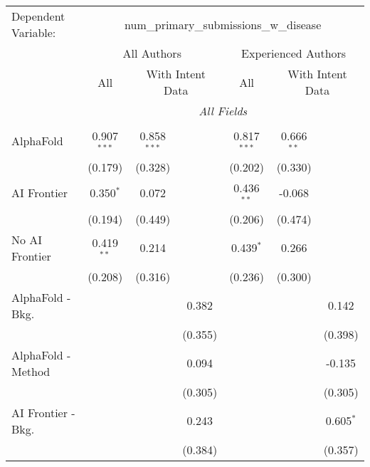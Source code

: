 \begingroup
\centering
\begin{tabular}{lcccccc}
   \tabularnewline \midrule \midrule
   Dependent Variable: & \multicolumn{6}{c}{num\_primary\_submissions\_w\_disease}\\
 & \multicolumn{3}{c}{All Authors} & \multicolumn{3}{c}{Experienced Authors} \\
\cmidrule(lr){2-4} \cmidrule(lr){5-7}
 & \multicolumn{1}{c}{All} & \multicolumn{2}{c}{With Intent Data} & \multicolumn{1}{c}{All} & \multicolumn{2}{c}{With Intent Data} \\
\cmidrule(lr){2-2} \cmidrule(lr){3-4} \cmidrule(lr){5-5} \cmidrule(lr){6-7}
 & \multicolumn{6}{c}{\textit{All Fields}} \\ \\
   AlphaFold               & 0.907$^{***}$ & 0.858$^{***}$ &              & 0.817$^{***}$ & 0.666$^{**}$ &   \\   
                           & (0.179)       & (0.328)       &              & (0.202)       & (0.330)      &   \\   
   AI Frontier             & 0.350$^{*}$   & 0.072         &              & 0.436$^{**}$  & -0.068       &   \\   
                           & (0.194)       & (0.449)       &              & (0.206)       & (0.474)      &   \\   
   No AI Frontier          & 0.419$^{**}$  & 0.214         &              & 0.439$^{*}$   & 0.266        &   \\   
                           & (0.208)       & (0.316)       &              & (0.236)       & (0.300)      &   \\   
   AlphaFold - Bkg.        &               &               & 0.382        &               &              & 0.142\\   
                           &               &               & (0.355)      &               &              & (0.398)\\   
   AlphaFold - Method      &               &               & 0.094        &               &              & -0.135\\   
                           &               &               & (0.305)      &               &              & (0.305)\\   
   AI Frontier - Bkg.      &               &               & 0.243        &               &              & 0.605$^{*}$\\   
                           &               &               & (0.384)      &               &              & (0.357)\\   

\end{tabular}
